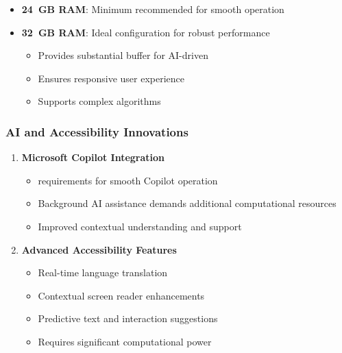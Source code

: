 \begin{itemize}
	\item \textbf{24~GB RAM}: Minimum recommended for smooth operation \supercite{EducationalEquityReport2024}
	\item \textbf{32~GB RAM}: Ideal configuration for robust performance \supercite{EducationalEquityReport2024}

	      \begin{itemize}
		      \item Provides substantial buffer for AI-driven  \supercite{AIinAccessibility}
		      \item Ensures responsive user experience \supercite{EducationalEquityReport2024}
		      \item Supports complex  algorithms \supercite{AIinAccessibility}
	      \end{itemize}

\end{itemize}



\subsubsection{AI and Accessibility Innovations}

\begin{enumerate}
	\item \textbf{Microsoft Copilot Integration}

	      \begin{itemize}
		      \item {} requirements for smooth Copilot operation \supercite{MicrosoftCopilotRequirements}
		      \item Background AI assistance demands additional computational resources \supercite{MicrosoftCopilotTech}
		      \item Improved contextual understanding and support \supercite{MicrosoftCopilotFeatures}
	      \end{itemize}

	\item \textbf{Advanced Accessibility Features}

	      \begin{itemize}
		      \item Real-time language translation \supercite{GoogleTranslateRealtime}
		      \item Contextual screen reader enhancements \supercite{AIinAccessibility}
		      \item Predictive text and interaction suggestions \supercite{PredictiveTextAccessibility}
		      \item Requires significant computational power \supercite{AIComputationalRequirements}
	      \end{itemize}

\end{enumerate}




